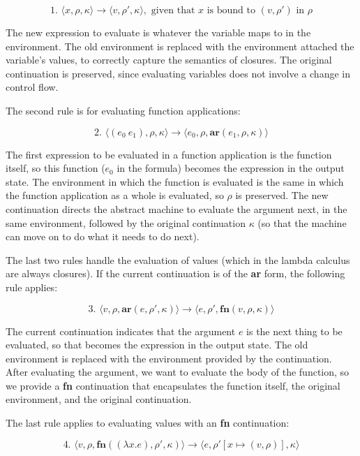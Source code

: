 \documentclass{article}
\begin{document}
$$
\text{1. }
\langle x, \rho, \kappa \rangle
\to
\langle v, \rho', \kappa \rangle,
\text{ given that $x$ is bound to $(v, \rho')$ in $\rho$}
$$

The new expression to evaluate is whatever the variable maps to in the environment. The old environment is replaced with the environment attached the variable's values, to correctly capture the semantics of closures. The original continuation is preserved, since evaluating variables does not involve a change in control flow.

The second rule is for evaluating function applications:

$$
\text{2. }
\langle (e_0\ e_1), \rho, \kappa \rangle
\to
\langle e_0, \rho, \textbf{ar}(e_1, \rho, \kappa) \rangle
$$

The first expression to be evaluated in a function application is the function itself, so this function ($e_0$ in the formula) becomes the expression in the output state. The environment in which the function is evaluated is the same in which the function application as a whole is evaluated, so $\rho$ is preserved. The new continuation directs the abstract machine to evaluate the argument next, in the same environment, followed by the original continuation $\kappa$ (so that the machine can move on to do what it needs to do next).

The last two rules handle the evaluation of values (which in the lambda calculus are always closures). If the current continuation is of the \textbf{ar} form, the following rule applies:

$$
\text{3. }
\langle v, \rho, \textbf{ar}(e, \rho', \kappa) \rangle
\to
\langle e, \rho', \textbf{fn}(v, \rho, \kappa) \rangle
$$

The current continuation indicates that the argument $e$ is the next thing to be evaluated, so that becomes the expression in the output state. The old environment is replaced with the environment provided by the continuation. After evaluating the argument, we want to evaluate the body of the function, so we provide a \textbf{fn} continuation that encapsulates the function itself, the original environment, and the original continuation.

The last rule applies to evaluating values with an \textbf{fn} continuation:

$$
\text{4. }
\langle v, \rho, \textbf{fn}((\lambda x.e), \rho', \kappa) \rangle
\to
\langle e, \rho'[x \mapsto (v, \rho)], \kappa \rangle
$$
\end{document}

